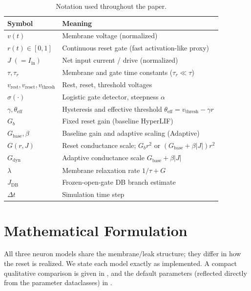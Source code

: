 \documentclass[journal]{IEEEtran}
\newcommand{\vth}{v_{\mathrm{thresh}}}
\newcommand{\vr}{v_{\mathrm{rest}}}
\newcommand{\vre}{v_{\mathrm{reset}}}
\newcommand{\teff}{\theta_{\mathrm{eff}}}
\newcommand{\Gb}{G_{b}}
\newcommand{\Gbase}{G_{\mathrm{base}}}
\newcommand{\Gdyn}{G_{\mathrm{dyn}}}
\newcommand{\Jdb}{J_{\mathrm{DB}}}
\begin{document}
\begin{table}[t]
\centering
\caption{Notation used throughout the paper.}
\label{tab:notation}
\footnotesize
\begin{tabular}{@{}ll@{}}
\toprule
Symbol & Meaning \\
\midrule
$v(t)$ & Membrane voltage (normalized) \\
$r(t)\in[0,1]$ & Continuous reset gate (fast activation-like proxy) \\
$J\;(=I_{\mathrm{in}})$ & Net input current / drive (normalized) \\
$\tau,\tau_r$ & Membrane and gate time constants ($\tau_r\ll\tau$) \\
$\vr,\vre,\vth$ & Rest, reset, threshold voltages \\
$\sigma(\cdot)$ & Logistic gate detector, steepness $\alpha$ \\
$\gamma,\teff$ & Hysteresis and effective threshold $\teff=\vth-\gamma r$ \\
$\Gb$ & Fixed reset gain (baseline HyperLIF) \\
$\Gbase,\beta$ & Baseline gain and adaptive scaling (Adaptive) \\
$G(r,J)$ & Reset conductance scale; $\Gb r^2$ or $(\Gbase+\beta|J|)r^2$ \\
$\Gdyn$ & Adaptive conductance scale $\Gbase+\beta|J|$ \\
$\lambda$ & Membrane relaxation rate $1/\tau + G$ \\
$\Jdb$ & Frozen-open-gate DB branch estimate \\
$\Delta t$ & Simulation time step \\
\bottomrule
\end{tabular}
\end{table}

\section{Mathematical Formulation}\label{sec:formulation}
All three neuron models share the membrane/leak structure; they differ in how
the reset is realized. We state each model exactly as implemented. A compact
qualitative comparison is given in , and the default
parameters (reflected directly from the parameter dataclasses) in
.
\end{document}

